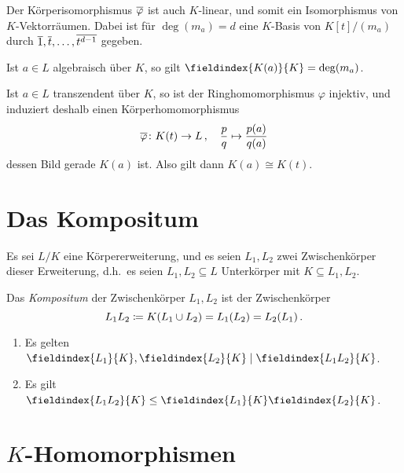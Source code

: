 Der Körperisomorphismus $\overline{\varphi}$ ist auch $K$-linear, und somit ein Isomorphismus von $K$-Vektorräumen.
Dabei ist für $\deg(m_a) = d$ eine $K$-Basis von $K[t]/(m_a)$ durch $\overline{1}, \overline{t}, \dotsc, \overline{t^{d-1}}$ gegeben.

\begin{corollary}
  Ist $a \in L$ algebraisch über $K$, so gilt $\fieldindex{K(a)}{K} = \deg(m_a)$.
\end{corollary}

Ist $a \in L$ transzendent über $K$, so ist der Ringhomomorphismus $\varphi$ injektiv, und induziert deshalb einen Körperhomomorphismus
\[
          \overline{\varphi}
  \colon  K(t)
  \to     L \,,
  \quad   \frac{p}{q}
  \mapsto \frac{p(a)}{q(a)}
\]
dessen Bild gerade $K(a)$ ist.
Also gilt dann $K(a) \cong K(t)$.





\section{Das Kompositum}

Es sei $L/K$ eine Körpererweiterung, und es seien $L_1, L_2$ zwei Zwischenkörper dieser Erweiterung, d.h.\ es seien $L_1, L_2 \subseteq L$ Unterkörper mit $K \subseteq L_1, L_2$.

\begin{definition}
  Das \emph{Kompositum} der Zwischenkörper $L_1, L_2$ ist der Zwischenkörper
  \[
              L_1 L_2
    \coloneqq  K(L_1 \cup L_2)
    =         L_1(L_2)
    =         L_2(L_1) \,.
  \]
\end{definition}

\begin{lemma}
  \begin{enumerate}
    \item
      Es gelten $\fieldindex{L_1}{K}, \fieldindex{L_2}{K} \divides \fieldindex{L_1 L_2}{K}$.
    \item
      Es gilt $\fieldindex{L_1 L_2}{K} \leq \fieldindex{L_1}{K} \fieldindex{L_2}{K}$.
  \end{enumerate}
\end{lemma}





\section{\texorpdfstring{$K$}{K}-Homomorphismen}

